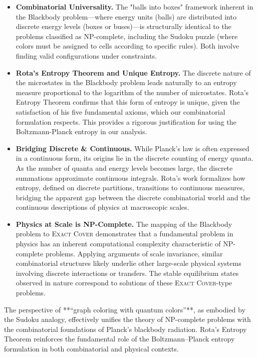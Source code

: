 \documentclass{report}
\begin{document}
\begin{itemize}
    \item
    \textbf{Combinatorial Universality.}
    The "balls into boxes" framework inherent in the Blackbody problem—where energy units (balls) are distributed into discrete energy levels (boxes or buses)—is structurally identical to the problems classified as NP-complete, including the Sudoku puzzle (where colors must be assigned to cells according to specific rules). Both involve finding valid configurations under constraints.

    \item
    \textbf{Rota’s Entropy Theorem and Unique Entropy.}
    The discrete nature of the microstates in the Blackbody problem leads naturally to an entropy measure proportional to the logarithm of the number of microstates. Rota’s Entropy Theorem confirms that this form of entropy is unique, given the satisfaction of his five fundamental axioms, which our combinatorial formulation respects. This provides a rigorous justification for using the Boltzmann-Planck entropy in our analysis.

    \item
    \textbf{Bridging Discrete \& Continuous.}
    While Planck's law is often expressed in a continuous form, its origins lie in the discrete counting of energy quanta. As the number of quanta and energy levels becomes large, the discrete summations approximate continuous integrals. Rota's work formalizes how entropy, defined on discrete partitions, transitions to continuous measures, bridging the apparent gap between the discrete combinatorial world and the continuous descriptions of physics at macroscopic scales.

    \item
    \textbf{Physics at Scale is NP-Complete.}
    The mapping of the Blackbody problem to \textsc{Exact Cover} demonstrates that a fundamental problem in physics has an inherent computational complexity characteristic of NP-complete problems. Applying arguments of scale invariance, similar combinatorial structures likely underlie other large-scale physical systems involving discrete interactions or transfers. The stable equilibrium states observed in nature correspond to solutions of these \textsc{Exact Cover}-type problems.

\end{itemize}

The perspective of **“graph coloring with quantum colors”**, as embodied by the Sudoku analogy, effectively unifies the theory of NP-complete problems with the combinatorial foundations of Planck’s blackbody radiation. Rota’s Entropy Theorem reinforces the fundamental role of the Boltzmann--Planck entropy formulation in both combinatorial and physical contexts.
\end{document}
